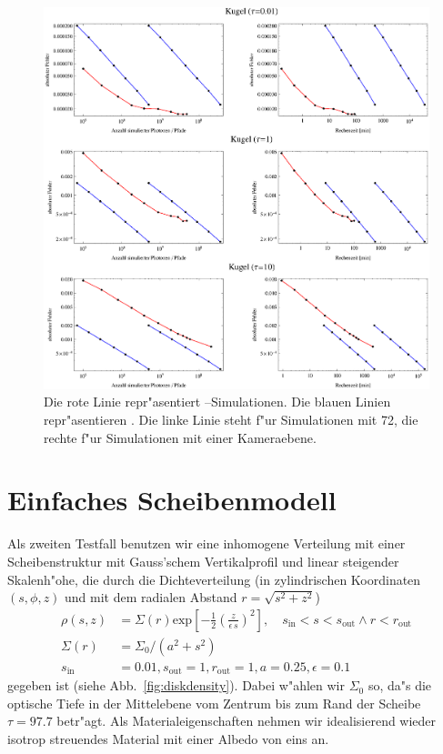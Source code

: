 		\begin{figure}
			\centering
			\includegraphics[width=1.0\textwidth]{sphereerrorplots.eps}
			\caption{Die rote Linie repr"asentiert \pirate--Simulationen. Die blauen Linien repr"asentieren \mctd. Die linke Linie steht f"ur Simulationen mit 72, die rechte f"ur Simulationen mit einer Kameraebene.}
			\label{fig:sphere_errors}
		\end{figure}


	\section{Einfaches Scheibenmodell}
	Als zweiten Testfall benutzen wir eine inhomogene Verteilung mit einer Scheibenstruktur mit Gauss'schem Vertikalprofil und linear steigender Skalenh"ohe, die durch die Dichteverteilung (in zylindrischen Koordinaten $(s,\phi,z)$ und mit dem radialen Abstand $r=\sqrt{s^2+z^2}$)
	\begin{align}
		\rho(s,z)&=\Sigma(r)\text{exp}\left[-\frac{1}{2}\left(\frac{z}{\epsilon\,s}\right)^2\right],\quad s_\text{in}<s<s_\text{out}\land r<r_\text{out} \nonumber\\
		\Sigma(r)&=\Sigma_0 / (a^2+s^2) \label{eq:disk_model} \\
		s_\text{in}&=0.01, s_\text{out}=1, r_\text{out}=1, a=0.25, \epsilon=0.1 \nonumber
	\end{align}
	gegeben ist (siehe Abb.~\ref{fig:diskdensity}).	Dabei w"ahlen wir $\Sigma_0$ so, da"s die optische Tiefe in der Mittelebene vom Zentrum bis zum Rand der Scheibe $\tau=97.7$ betr"agt. Als Materialeigenschaften nehmen wir idealisierend wieder isotrop streuendes Material mit einer Albedo von eins an.
	
